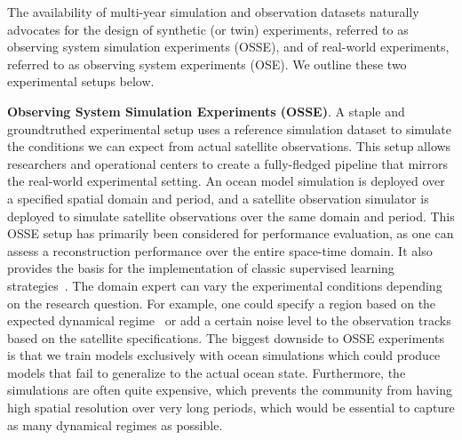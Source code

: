 The availability of multi-year simulation and observation datasets naturally advocates for the design of synthetic (or twin) experiments, referred to as observing system simulation experiments (OSSE), and of real-world experiments, referred to as observing system experiments (OSE).
We outline these two experimental setups below.

\textbf{Observing System Simulation Experiments (OSSE)}. A staple and groundtruthed experimental setup uses a reference simulation dataset to simulate the conditions we can expect from actual satellite observations. 
This setup allows researchers and operational centers to create a fully-fledged pipeline that mirrors the real-world experimental setting.
An ocean model simulation is deployed over a specified spatial domain and period, and a satellite observation simulator is deployed to simulate satellite observations over the same domain and period. 
This OSSE setup has primarily been considered for performance evaluation, as one can assess a reconstruction performance over the entire space-time domain. It also provides the basis for the implementation of classic supervised learning strategies~\cite{SSHInterpUNet,SSHInterpConvLSTM,SSHInterpAttention}.
The domain expert can vary the experimental conditions depending on the research question. 
For example, one could specify a region based on the expected dynamical regime~\cite{DCOSSEGULFSSH} or add a certain noise level to the observation tracks based on the satellite specifications.
The biggest downside to OSSE experiments is that we train models exclusively with ocean simulations which could produce models that fail to generalize to the actual ocean state. 
Furthermore, the simulations are often quite expensive, which prevents the community from having high spatial resolution over very long periods, which would be essential to capture as many dynamical regimes as possible.
\newpage


